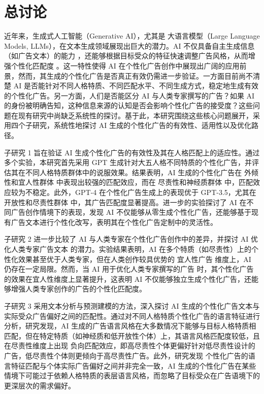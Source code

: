 \chapter{总讨论}
近年来，生成式人工智能（Generative AI），尤其是 大语言模型（Large Language Models, LLMs），在文本生成领域展现出巨大的潜力。AI 不仅具备自主生成信息（如广告文本）的能力 \citep[例如][]{karinshak2023working, bai2023artificial}，还能够根据目标受众的特征快速调整广告风格，从而增强个性化匹配度 \citep[例如][]{matz2024potential, simchon2024persuasive}。这一特性使得 AI 在个性化广告创作中展现出广阔的应用前景，然而，其生成的个性化广告是否真正有效仍需进一步验证。一方面目前尚不清楚 AI 是否能针对不同人格特质、不同匹配水平、不同生成方式，稳定地生成有效的个性化广告。另一方面，人们是否能区分 AI 与人类专家撰写的广告？如果 AI 的身份被明确告知，这种信息来源的认知是否会影响个性化广告的接受度？这些问题在现有研究中尚缺乏系统性的探讨。基于此，本研究围绕这些核心问题展开，采用四个子研究，系统性地探讨 AI 生成的个性化广告的有效性、适用性以及优化路径。

子研究 1 旨在验证 AI 生成个性化广告的有效性及其在人格匹配上的适应性。通过多个实验，本研究首先采用 GPT 生成针对大五人格不同特质的个性化广告，并评估其在不同人格特质群体中的说服效果。结果表明，AI 生成的个性化广告在 外倾性和宜人性群体 中表现出较强的匹配效应，而在 尽责性和神经质群体 中，匹配效应较为不稳定。此外，GPT-4 在个性化广告生成上的表现优于 GPT-3.5，尤其在 开放性和尽责性群体 中，其广告匹配度显著提高。进一步的实验探讨了 AI 在不同广告创作情境下的表现，发现 AI 不仅能够从零生成个性化广告，还能够基于现有广告文本进行个性化改写，表明其在个性化广告定制中的灵活性。

子研究 2 进一步比较了 AI 与人类专家在个性化广告创作中的差异，并探讨 AI 优化人类专家广告文本 的潜力。实验结果表明，AI 在多个特质（如尽责性）上的个性化效果甚至优于人类专家，但在人类创作较具优势的 宜人性广告 维度上，AI 仍存在一定局限。然而，当 AI 用于优化人类专家撰写的广告 时，其个性化广告的效果在宜人性维度上显著提升，这表明 AI 不仅能够独立生成个性化广告，还能够增强人类专家创作的广告的个性化匹配度。

子研究 3 采用文本分析与预测建模的方法，深入探讨 AI 生成的个性化广告文本与实际受众广告偏好之间的匹配性。通过对不同人格特质个性化广告的语言特征进行分析，研究发现，AI 生成的广告语言风格在大多数情况下能够与目标人格特质相匹配，但在特定特质（如神经质和低开放性个体）上，其语言风格匹配度较低，且在尽责性维度上出现 负向匹配效应，即高尽责性个体更偏好针对低尽责性设计的广告，低尽责性个体则更倾向于高尽责性广告。此外，研究发现 个性化广告的语言特征匹配与个体实际广告偏好之间并非完全一致，AI 生成的个性化广告在某些情境下可能过于依赖人格特质的表层语言风格，而忽略了目标受众在广告语境下的更深层次的需求偏好。


